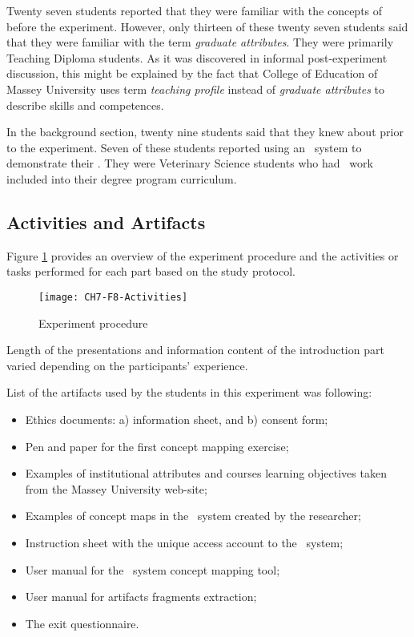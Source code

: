 Twenty seven students reported that they were familiar with the concepts
of \LLLs before the experiment. However, only thirteen of these twenty seven
students said that they were familiar with the term \textit{graduate
attributes}. They were primarily Teaching Diploma students. As it was discovered
in informal post-experiment discussion, this might be explained by the fact that
College of Education of Massey University uses term \textit{teaching profile}
instead of \textit{graduate attributes} to describe \LLLs skills and
competences.

In the background section, twenty nine students said that they knew about
\textit{\ep} prior to the experiment. Seven of these students reported using an
\ep~system to demonstrate their \LLLsn. They were Veterinary Science students
who had \ep~work included into their degree program curriculum.

\subsection{Activities and Artifacts}

Figure \ref{fig:procedure} provides an overview of the experiment procedure and
the activities or tasks performed for each part based on the study protocol.

\begin{figure}[htb]
\centering
\texttt{[image: CH7-F8-Activities]}
\caption{Experiment procedure}
\label{fig:procedure}
\end{figure}

Length of the presentations and information content of the introduction part
varied depending on the participants' experience.

List of the artifacts used by the students in this experiment was following:

\begin{itemize}
  \item Ethics documents: a) information sheet, and b) consent form;
  \item Pen and paper for the first concept mapping exercise;
  \item Examples of institutional attributes and courses learning objectives
  taken from the Massey University web-site;
  \item Examples of concept maps in the \ep~system created by the researcher;
  \item Instruction sheet with the unique access account to the \ep~system;
  \item User manual for the \ep~system concept mapping tool;
  \item User manual for artifacts fragments extraction;
  \item The exit questionnaire.
\end{itemize} 

